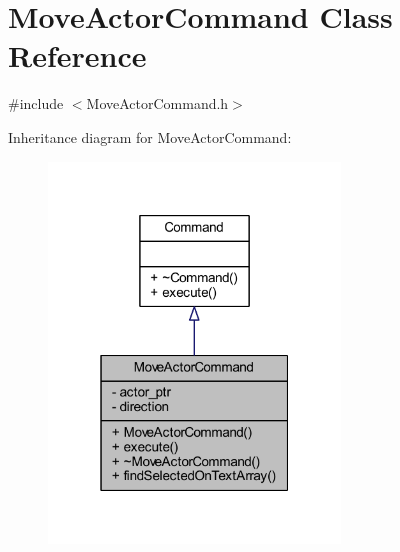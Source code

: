 \hypertarget{class_move_actor_command}{}\section{Move\+Actor\+Command Class Reference}
\label{class_move_actor_command}


{\ttfamily \#include $<$Move\+Actor\+Command.\+h$>$}



Inheritance diagram for Move\+Actor\+Command\+:
\nopagebreak
\begin{figure}[H]
\begin{center}
\leavevmode
\includegraphics[width=220pt]{class_move_actor_command__inherit__graph}
\end{center}
\end{figure}


